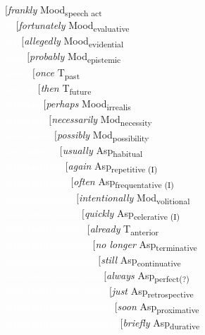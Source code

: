 \begin{exe}
\ex\label{bsp:hierarchyoneafafaf} 
{\small $[$\textit{frankly} Mood\textsubscript{speech act} \\
\textcolor{white}{nn}$[$\textit{fortunately} Mood\textsubscript{evaluative} \\
\textcolor{white}{nnn}$[$\textit{allegedly} Mood\textsubscript{evidential} \\
\textcolor{white}{nnnn}$[$\textit{probably} Mod\textsubscript{epistemic} \\
\textcolor{white}{nnnnn}$[$\textit{once} T\textsubscript{past} \\
\textcolor{white}{nnnnnn}$[$\textit{then} T\textsubscript{future} \\
\textcolor{white}{nnnnnnn}$[$\textit{perhaps} Mood\textsubscript{irrealis} \\
\textcolor{white}{nnnnnnnn}$[$\textit{necessarily} Mod\textsubscript{necessity} \\
\textcolor{white}{nnnnnnnnn}$[$\textit{possibly} Mod\textsubscript{possibility} \\
\textcolor{white}{nnnnnnnnnn}$[$\textit{usually} Asp\textsubscript{habitual} \\
\textcolor{white}{nnnnnnnnnnn}$[$\textit{again} Asp\textsubscript{repetitive (I)} \\
\textcolor{white}{nnnnnnnnnnnn}$[$\textit{often} Asp\textsubscript{frequentative (I)} \\
\textcolor{white}{nnnnnnnnnnnnn}$[$\textit{intentionally} Mod\textsubscript{volitional} \\
\textcolor{white}{nnnnnnnnnnnnnn}$[$\textit{quickly} Asp\textsubscript{celerative (I)} \\
\textcolor{white}{nnnnnnnnnnnnnnn}$[$\textit{already} T\textsubscript{anterior} \\
\textcolor{white}{nnnnnnnnnnnnnnnn}$[$\textit{no longer} Asp\textsubscript{terminative} \\
\textcolor{white}{nnnnnnnnnnnnnnnnn}$[$\textit{still} Asp\textsubscript{continuative} \\
\textcolor{white}{nnnnnnnnnnnnnnnnnn}$[$\textit{always} Asp\textsubscript{perfect(?)} \\
\textcolor{white}{nnnnnnnnnnnnnnnnnnn}$[$\textit{just} Asp\textsubscript{retrospective} \\
\textcolor{white}{nnnnnnnnnnnnnnnnnnnn}$[$\textit{soon} Asp\textsubscript{proximative} \\
\textcolor{white}{nnnnnnnnnnnnnnnnnnnnn}$[$\textit{briefly} Asp\textsubscript{durative} \\
}
\end{exe}
